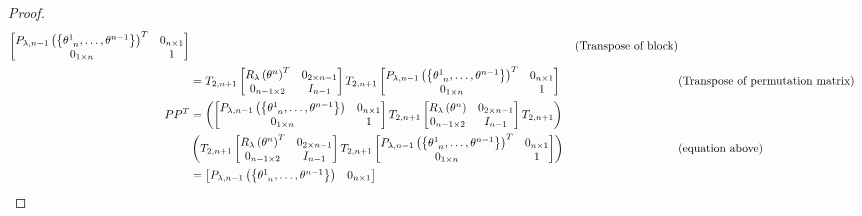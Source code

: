 \documentclass[../main.tex]{subfiles}
\begin{document}
\begin{proof}
\begin{align*}
\begin{bmatrix}
P_{\lambda,n-1}\left(\left\{\tensor{\theta}{^1_{n}},\dots,\tensor{\theta}{^{n-1}}\right\}\right)^T&0_{n\times 1}\\
0_{1\times n}&1\\
\end{bmatrix}
&&\text{(Transpose of block)}\\
&=
T_{2,n+1}
\begin{bmatrix}
R_\lambda\left(\tensor{\theta}{^n}\right)^T&0_{{2}\times{n-1}}\\
0_{{n-1}\times{2}}&{I}_{n-1}\\
\end{bmatrix}
T_{2,n+1}
\begin{bmatrix}
P_{\lambda,n-1}\left(\left\{\tensor{\theta}{^1_{n}},\dots,\tensor{\theta}{^{n-1}}\right\}\right)^T&0_{n\times 1}\\
0_{1\times n}&1\\
\end{bmatrix}
&&\text{(Transpose of permutation matrix)}\\
PP^T
&=
\left(\begin{bmatrix}
P_{\lambda,n-1}\left(\left\{\tensor{\theta}{^1_{n}},\dots,\tensor{\theta}{^{n-1}}\right\}\right)&0_{n\times 1}\\
0_{1\times n}&1\\
\end{bmatrix}
T_{2,n+1}
\begin{bmatrix}
R_\lambda\left(\tensor{\theta}{^n}\right)&0_{{2}\times{n-1}}\\
0_{{n-1}\times{2}}&{I}_{n-1}\\
\end{bmatrix}
T_{2,n+1}\right)\\
&\left(T_{2,n+1}
\begin{bmatrix}
R_\lambda\left(\tensor{\theta}{^n}\right)^T&0_{{2}\times{n-1}}\\
0_{{n-1}\times{2}}&{I}_{n-1}\\
\end{bmatrix}
T_{2,n+1}
\begin{bmatrix}
P_{\lambda,n-1}\left(\left\{\tensor{\theta}{^1_{n}},\dots,\tensor{\theta}{^{n-1}}\right\}\right)^T&0_{n\times 1}\\
0_{1\times n}&1\\
\end{bmatrix}\right)
&&\text{(equation above)}\\
&=
\begin{bmatrix}
P_{\lambda,n-1}\left(\left\{\tensor{\theta}{^1_{n}},\dots,\tensor{\theta}{^{n-1}}\right\}\right)&0_{n\times 1}\\

\end{bmatrix}
\end{align*}
\end{proof}
\end{document}
